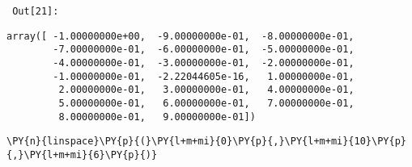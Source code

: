         {\par%
        \vspace{-1\smallerfontscale}%
        \noindent%
        \begin{minipage}{\cellleftmargin}%
    \hfill%
    {\smaller%
    \tt%
    \color{nbframe-out-prompt}%
    Out[21]:}%
    \hspace{\inputpadding}%
    \hspace{0em}%
    \hspace{3pt}%
    \end{minipage}%
        }%
    \begin{addmargin}[\cellleftmargin]{0em}%
    {\smaller%
    \vspace{-1\smallerfontscale}%
    
    
    
    \begin{verbatim}
array([ -1.00000000e+00,  -9.00000000e-01,  -8.00000000e-01,
        -7.00000000e-01,  -6.00000000e-01,  -5.00000000e-01,
        -4.00000000e-01,  -3.00000000e-01,  -2.00000000e-01,
        -1.00000000e-01,  -2.22044605e-16,   1.00000000e-01,
         2.00000000e-01,   3.00000000e-01,   4.00000000e-01,
         5.00000000e-01,   6.00000000e-01,   7.00000000e-01,
         8.00000000e-01,   9.00000000e-01])
    \end{verbatim}

    
}%
    \end{addmargin}%

{\par%
\vspace{-1\baselineskip}%
}%
\begin{notebookcell}[22]%
\begin{addmargin}[\cellleftmargin]{0em}%
{\smaller%
\par%
%
\vspace{-1\smallerfontscale}%
\begin{Verbatim}[commandchars=\\\{\}]
\PY{n}{linspace}\PY{p}{(}\PY{l+m+mi}{0}\PY{p}{,}\PY{l+m+mi}{10}\PY{p}{,}\PY{l+m+mi}{6}\PY{p}{)}
\end{Verbatim}
%
\par%
\vspace{-1\smallerfontscale}}%
\end{addmargin}
\end{notebookcell}

\par\vspace{1\smallerfontscale}%
    

